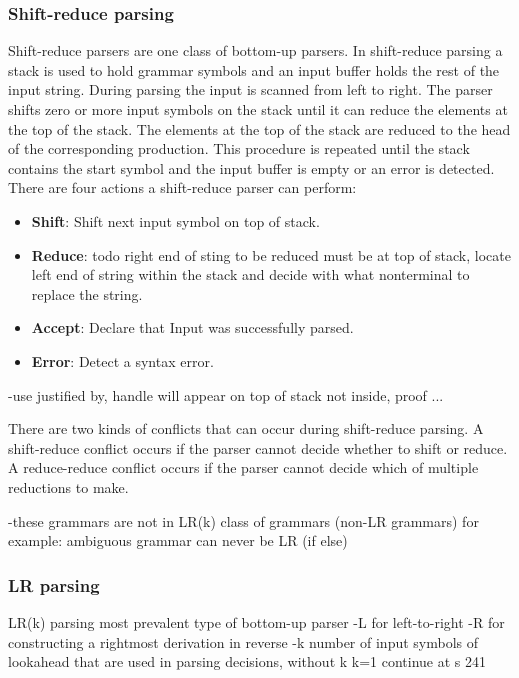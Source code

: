 \subsubsection{Shift-reduce parsing}\label{sec:BackgroundParserShiftReduce}
Shift-reduce parsers are one class of bottom-up parsers. In shift-reduce parsing a stack is used to hold grammar symbols and an input buffer holds the rest of the input string.
During parsing the input is scanned from left to right. The parser shifts zero or more input symbols on the stack until it can reduce the elements at the top of the stack. The elements at the top of the stack are reduced to the head of the corresponding production. This procedure is repeated until the stack contains the start symbol and the input buffer is empty or an error is detected. \cite{Aho.2007}\\
There are four actions a shift-reduce parser can perform:
\begin{itemize}%
	\item \textbf{Shift}: Shift next input symbol on top of stack.
	\item \textbf{Reduce}: todo right end of sting to be reduced must be at top of stack, locate left end of string within the stack and decide with what nonterminal to replace the string.
	\item \textbf{Accept}: Declare that Input was successfully parsed.
	\item \textbf{Error}: Detect a syntax error.
\end{itemize}
\label{itemize:BackgroundBNF}

-use justified by, handle will appear on top of stack not inside, proof ...

There are two kinds of conflicts that can occur during shift-reduce parsing. A shift-reduce conflict occurs if the parser cannot decide whether to shift or reduce.
A reduce-reduce conflict occurs if the parser cannot decide which of multiple reductions to make.

-these grammars are not in LR(k) class of grammars (non-LR grammars)
for example: ambiguous grammar can never be LR (if else)
\cite{Aho.2007}

\subsubsection{LR parsing}\label{sec:BackgroundParserLR}

LR(k) parsing most prevalent type of bottom-up parser
-L for left-to-right
-R for constructing a rightmost derivation in reverse
-k number of input symbols of lookahead that are used in parsing decisions, without k k=1
continue at s 241

